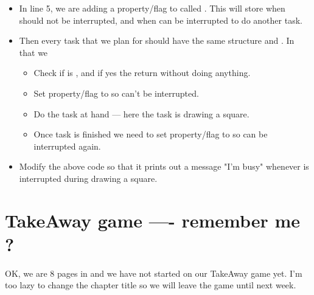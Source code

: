 \documentclass{coderdojo}
\begin{document}
\begin{itemize}
\item[\pointSymbol]
In line 5, we are adding a property/flag to  called . This will store  when  should not be interrupted, and   when  can be interrupted to  do another task.
 
\item[\pointSymbol]
Then every task that we plan for  should have the same structure and . In that we 
\begin{itemize}
\item Check if  is , and if yes the return without doing anything.
\item Set property/flag  to  so  can't be interrupted.
\item Do the task at hand --- here the task is drawing a square.
\item Once task is finished we need to set property/flag  to  so  can be interrupted again.
\end{itemize}
\end{itemize}

\begin{itemize}
\item[\todoSymbol] \color{todo}
Modify the above code so that it prints out a message "I'm busy" whenever  is interrupted during drawing a square.
\end{itemize}

\section{TakeAway game ---- remember me ?}\label{sec:game}

OK, we are 8 pages in and we have not started on our TakeAway game yet.  I'm too lazy to change the chapter title so we will leave the game until next week.
\end{document}
